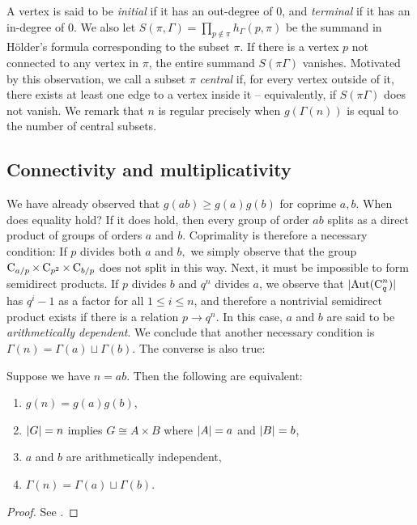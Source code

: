 A vertex is said to be \emph{initial} if it has an out-degree of $0$, and \emph{terminal} if it has an in-degree of $0$.
We also let $S(\pi, \Gamma) = \prod_{p \notin \pi}h_\Gamma(p, \pi)$ be the summand in Hölder's formula corresponding to the subset $\pi$.
If there is a vertex $p$ not connected to any vertex in $\pi$, the entire summand $S(\pi \Gamma)$ vanishes.
Motivated by this observation, we call a subset $\pi$ \emph{central} if, for every vertex outside of it, there exists at least one edge to a vertex inside it -- equivalently, if $S(\pi \Gamma)$ does not vanish.
We remark that $n$ is regular precisely when $g(\Gamma(n))$ is equal to the number of central subsets.

\subsection{Connectivity and multiplicativity}
We have already observed that $g(ab) \ge g(a)g(b)$ for coprime $a, b$.
When does equality hold? If it does hold, then every group of order $ab$ splits as a direct product of groups of orders $a$ and $b$.
Coprimality is therefore a necessary condition: If $p$ divides both $a$ and $b,$ we simply observe that the group $\operatorname{C}_{a/p} \times \operatorname{C}_{p^2} \times \operatorname{C}_{b/p}$ does not split in this way.
Next, it must be impossible to form semidirect products.
If $p$ divides $b$ and $q^n$ divides $a$, we observe that $\lvert\operatorname{Aut}(\operatorname{C}_{q}^n)\rvert$ has $q^i - 1$ as a factor for all $1 \le i \le n$, and therefore a nontrivial semidirect product exists if there is a relation $p \rightarrow q^n$.
In this case, $a$ and $b$ are said to be \emph{arithmetically dependent}.
We conclude that another necessary condition is $\Gamma(n) = \Gamma(a) \sqcup \Gamma(b)$.
 The converse is also true:

\begin{thm}
	Suppose we have $n = ab$.
Then the following are equivalent:
	\begin{enumerate}
		\item $g(n) = g(a)g(b)$,
		\item $\lvert G\rvert = n$ implies $G \cong A \times B$ where $\lvert A\rvert = a$ and $\lvert B\rvert = b$,
		\item $a$ and $b$ are arithmetically independent,
		\item $\Gamma(n) = \Gamma(a) \sqcup \Gamma(b)$.
	\end{enumerate}
\end{thm}
\begin{proof}
	See {\cite[Lem.~21.19]{monolith}}.
\end{proof}


